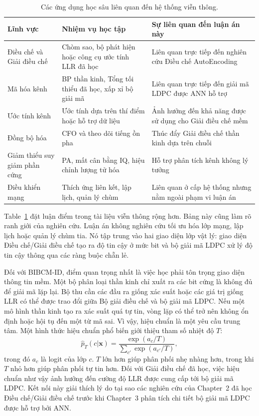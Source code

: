 \begin{table}[H]
\centering
\caption{Các ứng dụng học sâu liên quan đến hệ thống viễn thông.}
\label{tab:dl_telecom_applications}
\begin{tabularx}{\textwidth}{>{\raggedright\arraybackslash}p{}>{\raggedright\arraybackslash}p{}>{\raggedright\arraybackslash}X}
\toprule
Lĩnh vực & Nhiệm vụ học tập & Sự liên quan đến luận án này\\
\midrule
Điều chế và Giải điều chế & Chòm sao, bộ phát hiện hoặc công cụ ước tính LLR đã học & Liên quan trực tiếp đến nghiên cứu Điều chế AutoEncoding\\
Mã hóa kênh & BP thần kinh, Tổng tối thiểu đã học, xấp xỉ bộ giải mã & Liên quan trực tiếp đến giải mã LDPC được ANN hỗ trợ\\
Ước tính kênh & Ước tính dựa trên thí điểm hoặc hỗ trợ dữ liệu & Ảnh hưởng đến khả năng được sử dụng cho Giải điều chế mềm\\
Đồng bộ hóa & CFO và theo dõi tiếng ồn pha & Thúc đẩy Giải điều chế thần kinh dựa trên chuỗi\\
Giảm thiểu suy giảm phần cứng & PA, mất cân bằng IQ, hiệu chỉnh lượng tử hóa & Hỗ trợ phân tích kênh không lý tưởng\\
Điều khiển mạng & Thích ứng liên kết, lập lịch, quản lý chùm & Liên quan ở cấp hệ thống nhưng nằm ngoài phạm vi luận án\\
\bottomrule
\end{tabularx}
\end{table}

Table~\ref{tab:dl_telecom_applications} đặt luận điểm trong tài liệu viễn thông rộng hơn. Bảng này cũng làm rõ ranh giới của nghiên cứu. Luận án không nghiên cứu tối ưu hóa lớp mạng, lập lịch hoặc quản lý chùm tia. Nó tập trung vào hai giao diện lớp vật lý: giao diện Điều chế/Giải điều chế tạo ra độ tin cậy ở mức bit và bộ giải mã LDPC xử lý độ tin cậy thông qua các ràng buộc chẵn lẻ.

Đối với BIBCM-ID, điểm quan trọng nhất là việc học phải tôn trọng giao diện thông tin mềm. Một bộ phân loại thần kinh chỉ xuất ra các bit cứng là không đủ để giải mã lặp lại. Bộ thu cần các đầu ra giống xác suất hoặc các giá trị giống LLR có thể được trao đổi giữa Bộ giải điều chế và bộ giải mã LDPC. Nếu một mô hình thần kinh tạo ra xác suất quá tự tin, vòng lặp có thể trở nên không ổn định hoặc hội tụ đến một từ mã sai. Vì vậy, hiệu chuẩn là một yêu cầu trung tâm. Một hình thức hiệu chuẩn phổ biến giới thiệu tham số nhiệt độ $T$:
\begin{equation}
\label{eq:temperature_scaling_ch1}
\hat{p}_T(c|\mathbf{x})=
\frac{\exp(a_c/T)}
{\sum_{c'}\exp(a_{c'}/T)},
\end{equation}
trong đó $a_c$ là logit của lớp $c$. $T$ lớn hơn giúp phân phối nhẹ nhàng hơn, trong khi $T$ nhỏ hơn giúp phân phối tự tin hơn. Đối với Giải điều chế đã học, việc hiệu chuẩn như vậy ảnh hưởng đến cường độ LLR được cung cấp tới bộ giải mã LDPC. Kết nối này giải thích lý do tại sao các nghiên cứu của Chapter~2 đã học Điều chế/Giải điều chế trước khi Chapter~3 phân tích chi tiết bộ giải mã LDPC được hỗ trợ bởi ANN.

